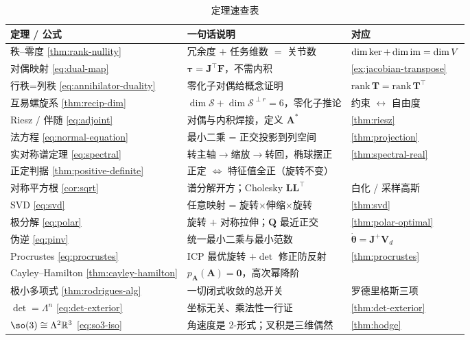 \begin{table}[H]\centering\small
\caption{定理速查表}
\begin{tabular}{lll}
\toprule
定理 / 公式 & 一句话说明 & 对应 \\
\midrule
秩--零度 \cref{thm:rank-nullity} & 冗余度 $+$ 任务维数 $=$ 关节数 & $\dim\ker+\dim\operatorname{im}=\dim V$ \\
对偶映射 \cref{eq:dual-map} & $\boldsymbol{\tau}=\mathbf{J}^\top\mathbf{F}$，不需内积 & \cref{ex:jacobian-transpose} \\
行秩=列秩 \cref{eq:annihilator-duality} & 零化子对偶给概念证明 & $\mathrm{rank}\,\mathbf{T}=\mathrm{rank}\,\mathbf{T}^\top$ \\
互易螺旋系 \cref{thm:recip-dim} & $\dim\mathcal{S}+\dim\mathcal{S}^{\perp r}=6$，零化子推论 & 约束 $\leftrightarrow$ 自由度 \\
Riesz / 伴随 \cref{eq:adjoint} & 对偶与内积焊接，定义 $\mathbf{A}^*$ & \cref{thm:riesz} \\
法方程 \cref{eq:normal-equation} & 最小二乘 = 正交投影到列空间 & \cref{thm:projection} \\
实对称谱定理 \cref{eq:spectral} & 转主轴$\to$缩放$\to$转回，椭球摆正 & \cref{thm:spectral-real} \\
正定判据 \cref{thm:positive-definite} & 正定 $\iff$ 特征值全正（旋转不变） & \\
对称平方根 \cref{cor:sqrt} & 谱分解开方；Cholesky $\mathbf{L}\mathbf{L}^\top$ & 白化 / 采样高斯 \\
SVD \cref{eq:svd} & 任意映射 = 旋转$\times$伸缩$\times$旋转 & \cref{thm:svd} \\
极分解 \cref{eq:polar} & 旋转 $+$ 对称拉伸；$\mathbf{Q}$ 最近正交 & \cref{thm:polar-optimal} \\
伪逆 \cref{eq:pinv} & 统一最小二乘与最小范数 & $\dot{\boldsymbol{\theta}}=\mathbf{J}^+\mathbf{V}_d$ \\
Procrustes \cref{eq:procrustes} & ICP 最优旋转 $+\det$ 修正防反射 & \cref{thm:procrustes} \\
Cayley--Hamilton \cref{thm:cayley-hamilton} & $p_{\mathbf{A}}(\mathbf{A})=\mathbf{0}$，高次幂降阶 & \\
极小多项式 \cref{thm:rodrigues-alg} & 一切闭式收敛的总开关 & 罗德里格斯三项 \\
$\det=\Lambda^n$ \cref{eq:det-exterior} & 坐标无关、乘法性一行证 & \cref{thm:det-exterior} \\
$\so(3)\cong\Lambda^2\mathbb{R}^3$ \cref{eq:so3-iso} & 角速度是 2-形式；叉积是三维偶然 & \cref{thm:hodge} \\
\bottomrule
\end{tabular}
\end{table}

